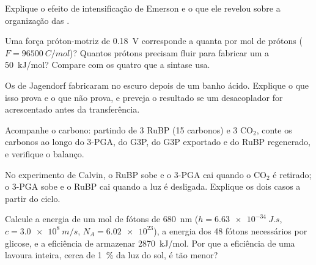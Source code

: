 \begin{exercise}[$\star\star$]\label{exo:b1:photosynthesis:5}
Explique o efeito de intensificação de Emerson e o que ele revelou sobre
a organização das .
\end{exercise}

\begin{exercise}[$\star\star$]\label{exo:b1:photosynthesis:6}
Uma força próton-motriz de \qty{0.18}{V} corresponde a quanta  por mol de prótons ($F = \qty{96500}{C/mol}$)? Quantos prótons
precisam fluir para fabricar um  a \qty{50}{kJ/mol}? Compare com os
quatro que a sintase usa.
\end{exercise}

\begin{exercise}[$\star\star$]\label{exo:b1:photosynthesis:7}
Os  de Jagendorf fabricaram  no escuro depois de um banho
ácido. Explique o que isso prova e o que não prova, e preveja o
resultado se um desacoplador for acrescentado antes da transferência.
\end{exercise}

\begin{exercise}[$\star\star$]\label{exo:b1:photosynthesis:8}
Acompanhe o carbono: partindo de 3 RuBP (15 carbonos) e 3
$\mathrm{CO_2}$, conte os carbonos ao longo do 3-PGA, do G3P, do G3P
exportado e do RuBP regenerado, e verifique o balanço.
\end{exercise}

\begin{exercise}[$\star\star$]\label{exo:b1:photosynthesis:9}
No experimento de Calvin, o RuBP sobe e o 3-PGA cai quando o
$\mathrm{CO_2}$ é retirado; o 3-PGA sobe e o RuBP cai quando a luz é
desligada. Explique os dois casos a partir do ciclo.
\end{exercise}

\begin{exercise}[$\star\star\star$]\label{exo:b1:photosynthesis:10}
Calcule a energia de um mol de fótons de \qty{680}{nm} ($h =
\qty{6.63e-34}{J.s}$, $c = \qty{3.0e8}{m/s}$, $N_A = \num{6.02e23}$), a
energia dos 48 fótons necessários por glicose, e a eficiência de
armazenar \qty{2870}{kJ/mol}. Por que a eficiência de uma lavoura
inteira, cerca de \qty{1}{\%} da luz do sol, é tão menor?
\end{exercise}

